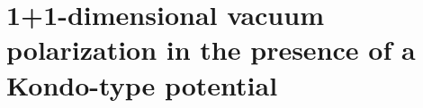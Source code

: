 \chapter{1+1-dimensional vacuum polarization in the presence of a Kondo-type potential}\label{chap-vacuum}

%

%
%
%

